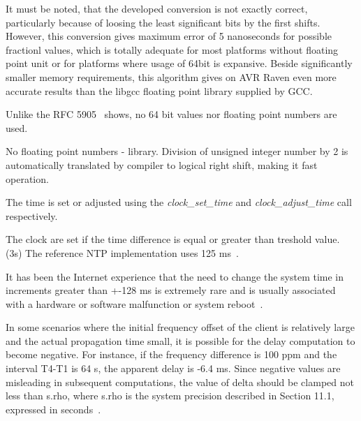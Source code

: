 It must be noted, that the developed conversion is not exactly correct, particularly
because of loosing the least significant bits by the first shifts.
However, this conversion gives maximum error of 5 nanoseconds for possible fractionl values,
which is totally adequate for most platforms without floating point unit or
for platforms where usage of 64bit is expansive.
Beside significantly smaller memory requirements,
this algorithm gives on AVR Raven even more accurate results than the libgcc
floating point library supplied by GCC.


Unlike the RFC 5905~\cite{rfc5905} shows, no 64 bit values nor floating point numbers are used.

No floating point numbers - library.
Division of unsigned integer number by 2 is automatically translated by compiler to logical right shift,
making it fast operation.


The time is set or adjusted using the {\it{clock\_set\_time}}
and {\it{clock\_adjust\_time}} call respectively.

The clock are set if the time difference is equal or greater than
treshold value. (3s)
The reference NTP implementation uses 125 ms~\cite{rfc5905}.

It has been the Internet
experience that the need to change the system time in increments
greater than +-128 ms is extremely rare and is usually associated
with a hardware or software malfunction or system reboot~\cite{rfc1589}.


%
In some scenarios where the initial frequency offset of the client is
  relatively large and the actual propagation time small, it is
   possible for the delay computation to become negative.  For instance,
   if the frequency difference is 100 ppm and the interval T4-T1 is 64
   s, the apparent delay is -6.4 ms.  Since negative values are
   misleading in subsequent computations, the value of delta should be
   clamped not less than s.rho, where s.rho is the system precision
   described in Section 11.1, expressed in seconds~\cite{rfc5905}.
%
